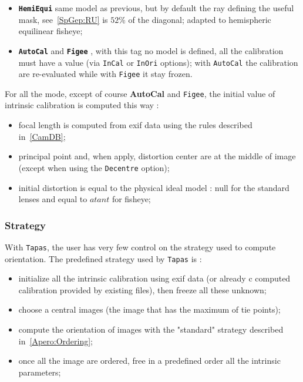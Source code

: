 \begin{itemize}
   \item {\tt \bf HemiEqui}  same model as previous, but  by default the ray defining
         the useful mask, see~\ref{SpGep:RU} is $52\%$ of the diagonal; adapted
         to hemispheric equilinear fisheye;


   \item {\tt \bf AutoCal} and {\tt \bf Figee} , with this tag no model is defined,
         all the calibration must have a value (via {\tt InCal} or {\tt InOri} options);
         with {\tt  AutoCal} the calibration are re-evaluated while with {\tt  Figee}
         it stay frozen.

\end{itemize}


For all the mode, except of course {\bf AutoCal} and {\tt Figee},  the initial
value of intrinsic calibration is computed this way :

\begin{itemize}
   \item focal length is computed from exif data using the rules described in~\ref{CamDB};

   \item principal point and, when apply, distortion center are  at the middle
         of image (except when using the {\tt Decentre} option);

   \item initial distortion is equal to the physical ideal model :   null for the
         standard lenses and equal to $atant$ for  fisheye;

\end{itemize}

\subsubsection{Strategy}

With {\tt Tapas}, the user has very few control on the  strategy used to compute
orientation.  The predefined strategy used by {\tt Tapas} is :

\begin{itemize}
   \item initialize all the intrinsic calibration using exif data (or already c
         computed calibration provided by existing files), then freeze all these unknown;

   \item choose a central images (the image that has the maximum of tie points);

   \item compute the orientation of images with the "standard" strategy described
          in~\ref{Apero:Ordering};


   \item once all the image are ordered, free in a predefined order all the intrinsic
         parameters;

\end{itemize}


